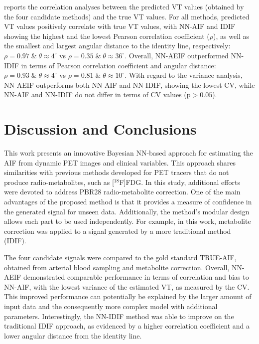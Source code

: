         
        reports the correlation analyses between the predicted \gls{VT} values (obtained by the four candidate methods) and the true \gls{VT} values. For all methods, predicted \gls{VT} values positively correlate with true \gls{VT} values, with \gls{NN}-\gls{AIF} and \gls{IDIF} showing the highest and the lowest Pearson correlation coefficient ($\rho$), as well as the smallest and largest angular distance to the identity line, respectively: $\rho = 0.97 \; \& \;  \theta \approx 4^{\circ}$ vs $\rho = 0.35 \; \&  \; \theta \approx 36^{\circ}$. Overall, \gls{NN}-\gls{AE}\gls{IF} outperformed \gls{NN}-\gls{IDIF} in terms of Pearson correlation coefficient and angular distance: $\rho = 0.93 \; \& \; \theta  \approx 4^{\circ}$ vs $\rho = 0.81 \; \&  \; \theta \approx 10^{\circ}$. With regard to the variance analysis, \gls{NN}-\gls{AE}\gls{IF} outperforms both \gls{NN}-\gls{AIF} and \gls{NN}-\gls{IDIF}, showing the lowest \gls{CV}, while \gls{NN}-\gls{AIF} and \gls{NN}-\gls{IDIF} do not differ in terms of \gls{CV} values (p$>0.05$).
    
    \section{Discussion and Conclusions} \label{sec:a_bayesian_neural_network-based_method_for_the_extraction_of_a_metabolite_corrected_arterial_input_function_from_dynamic_pbr28_pet_appendix_discussion_and_conclusions}
        This work presents an innovative Bayesian \gls{NN}-based approach for estimating the \gls{AIF} from dynamic \gls{PET} images and clinical variables. This approach shares similarities with previous methods developed for \gls{PET} tracers that do not produce radio-metabolites, such as [$^{18}$F]\gls{FDG}. In this study, additional efforts were devoted to address \gls{PBR28} radio-metabolite correction. One of the main advantages of the proposed method is that it provides a measure of confidence in the generated signal for unseen data. Additionally, the method's modular design allows each part to be used independently. For example, in this work, metabolite correction was applied to a signal generated by a more traditional method (\gls{IDIF}). 
        
        The four candidate signals were compared to the gold standard TRUE-\gls{AIF}, obtained from arterial blood sampling and metabolite correction. Overall, \gls{NN}-\gls{AE}\gls{IF} demonstrated comparable performance in terms of correlation and bias to \gls{NN}-\gls{AIF}, with the lowest variance of the estimated \gls{VT}, as measured by the \gls{CV}. This improved performance can potentially be explained by the larger amount of input data and the consequently more complex model with additional parameters. Interestingly, the \gls{NN}-\gls{IDIF} method was able to improve on the traditional \gls{IDIF} approach, as evidenced by a higher correlation coefficient and a lower angular distance from the identity line.
        
